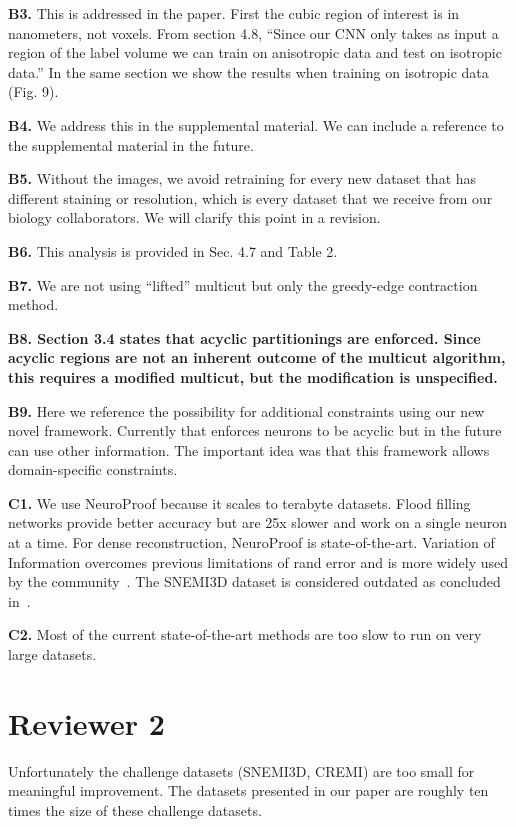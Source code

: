 \documentclass[10pt,twocolumn,letterpaper]{article}
\begin{document}
\textbf{B3.} This is addressed in the paper. First the cubic region of interest is in nanometers, not voxels. From section 4.8, ``Since our CNN only takes as input a region of the label volume we can train on anisotropic data and test on isotropic data.'' In the same section we show the results when training on isotropic data (Fig. 9). 

\textbf{B4.} We address this in the supplemental material. We can include a reference to the supplemental material in the future.

\textbf{B5.} Without the images, we avoid retraining for every new dataset that has different staining or resolution, which is every dataset that we receive from our biology collaborators. We will clarify this point in a revision.

\textbf{B6.} This analysis is provided in Sec. 4.7 and Table 2.

\textbf{B7.} We are not using ``lifted'' multicut but only the greedy-edge contraction method.

\textbf{B8. Section 3.4 states that acyclic partitionings are enforced. Since acyclic regions are not an inherent outcome of the multicut algorithm, this requires a modified multicut, but the modification is unspecified.}

\textbf{B9.} Here we reference the possibility for additional constraints using our new novel framework. Currently that enforces neurons to be acyclic but in the future can use other information. The important idea was that this framework allows domain-specific constraints.

\textbf{C1.} We use NeuroProof because it scales to terabyte datasets. Flood filling networks provide better accuracy but are 25x slower and work on a single neuron at a time. For dense reconstruction, NeuroProof is state-of-the-art. Variation of Information overcomes previous limitations of rand error and is more widely used by the community~\cite{lee2017superhuman,nunez2013machine}. The SNEMI3D dataset is considered outdated as concluded in~\cite{lee2017superhuman}. 

\textbf{C2.} Most of the current state-of-the-art methods are too slow to run on very large datasets.

\section*{Reviewer 2}

Unfortunately the challenge datasets (SNEMI3D, CREMI) are too small for meaningful improvement. The datasets presented in our paper are roughly ten times the size of these challenge datasets. 
\end{document}
